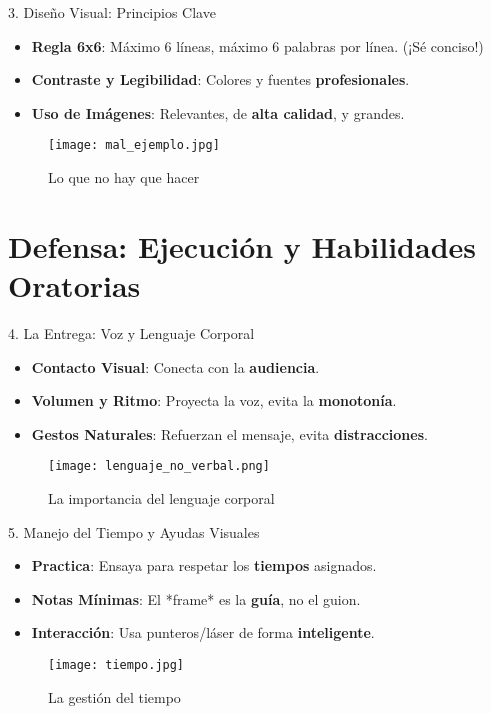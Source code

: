 \documentclass{beamer}
\begin{document}
\begin{frame}{3. Diseño Visual: Principios Clave}
    \begin{itemize}
        \item \textbf{Regla 6x6}: Máximo 6 líneas, máximo 6 palabras por línea. (¡Sé conciso!)
        \item \textbf{Contraste y Legibilidad}: Colores y fuentes \textbf{profesionales}.
        \item \textbf{Uso de Imágenes}: Relevantes, de \textbf{alta calidad}, y grandes.
    \end{itemize}
    
    \vspace{0.5cm}
    \begin{figure}
        \centering
        \texttt{[image: mal\_ejemplo.jpg]}
        \caption{Lo que no hay que hacer}
    \end{figure}
\end{frame}

\section{Defensa: Ejecución y Habilidades Oratorias}

\begin{frame}{4. La Entrega: Voz y Lenguaje Corporal}
    \begin{itemize}
        \item \textbf{Contacto Visual}: Conecta con la \textbf{audiencia}.
        \item \textbf{Volumen y Ritmo}: Proyecta la voz, evita la \textbf{monotonía}.
        \item \textbf{Gestos Naturales}: Refuerzan el mensaje, evita \textbf{distracciones}.
    \end{itemize}
    
    \vspace{0.5cm}
    \begin{figure}
        \centering
        \texttt{[image: lenguaje\_no\_verbal.png]}
        \caption{La importancia del lenguaje corporal}
    \end{figure}
\end{frame}

\begin{frame}{5. Manejo del Tiempo y Ayudas Visuales}
    \begin{itemize}
        \item \textbf{Practica}: Ensaya para respetar los \textbf{tiempos} asignados.
        \item \textbf{Notas Mínimas}: El *frame* es la \textbf{guía}, no el guion.
        \item \textbf{Interacción}: Usa punteros/láser de forma \textbf{inteligente}.
    \end{itemize}
    
    \vspace{0.5cm}
    \begin{figure}
        \centering
        \texttt{[image: tiempo.jpg]}
        \caption{La gestión del tiempo}
    \end{figure}
\end{frame}
\end{document}
